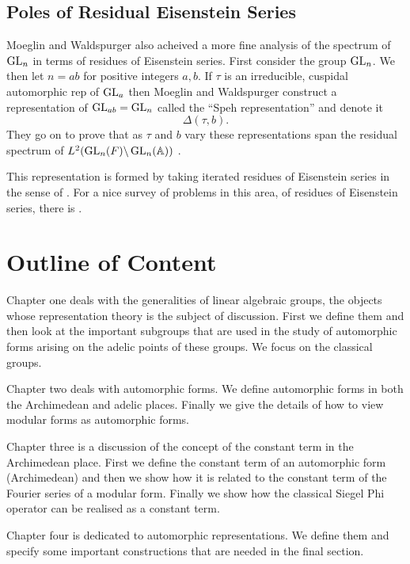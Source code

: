 \subsection{Poles of Residual Eisenstein Series}
Moeglin and Waldspurger also acheived a more fine analysis of the spectrum of \(\operatorname{GL}_n\) in terms of residues of Eisenstein series. 
First consider the group \(\operatorname{GL}_n\). We then let \(n = ab\) for positive integers \(a,b\). If \(\tau\) is an irreducible, cuspidal automorphic rep of \(\operatorname{GL}_a\) then Moeglin and Waldspurger construct a representation of \(\operatorname{GL}_{ab} = \operatorname{GL}_n\) called the ``Speh representation'' and denote it 
\[\Delta(\tau, b).\]
They go on to prove that as \(\tau\) and \(b\) vary these representations span the residual spectrum of \(L^2(\GL_n(F) \backslash \GL_n(\A))\) \cite[Thm. 1.1]{jiangPolesCertainResidual2013}.

This representation is formed by taking iterated residues of Eisenstein series in the sense of \cite[V]{moeglinSpectralDecompositionEisenstein1995}. For a nice survey of problems in this area, of residues of Eisenstein series, there is \cite{jiangResiduesEisensteinSeries2008a}.


\section*{Outline of Content}
Chapter one deals with the generalities of linear algebraic groups, the objects whose representation theory is the subject of discussion. First we define them and then look at the important subgroups that are used in the study of automorphic forms arising on the adelic points of these groups. We focus on the classical groups.

Chapter two deals with automorphic forms. We define automorphic forms in both the Archimedean and adelic places. Finally we give the details of how to view modular forms as automorphic forms. 

Chapter three is a discussion of the concept of the constant term in the Archimedean place. First we define the constant term of an automorphic form (Archimedean) and then we show how it is related to the constant term of the Fourier series of a modular form. Finally we show how the classical Siegel Phi operator can be realised as a constant term.

Chapter four is dedicated to automorphic representations. We define them and specify some important constructions that are needed in the final section.

